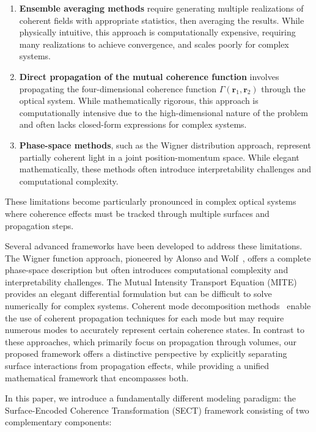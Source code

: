\documentclass[a4paper,12pt]{article}
\begin{document}
\begin{enumerate}
    \item \textbf{Ensemble averaging methods} require generating multiple realizations of coherent fields with appropriate statistics, then averaging the results. While physically intuitive, this approach is computationally expensive, requiring many realizations to achieve convergence, and scales poorly for complex systems.
    
    \item \textbf{Direct propagation of the mutual coherence function} involves propagating the four-dimensional coherence function $\Gamma(\bm{r}_1, \bm{r}_2)$ through the optical system. While mathematically rigorous, this approach is computationally intensive due to the high-dimensional nature of the problem and often lacks closed-form expressions for complex systems.
    
    \item \textbf{Phase-space methods}, such as the Wigner distribution approach, represent partially coherent light in a joint position-momentum space. While elegant mathematically, these methods often introduce interpretability challenges and computational complexity.
\end{enumerate}

These limitations become particularly pronounced in complex optical systems where coherence effects must be tracked through multiple surfaces and propagation steps.

Several advanced frameworks have been developed to address these limitations. The Wigner function approach, pioneered by 
Alonso and Wolf~\cite{Alonso2011}, offers a complete phase-space description but often introduces computational 
complexity and interpretability challenges. The Mutual Intensity Transport Equation (MITE)~\cite{FischerVisser2004} 
provides an elegant differential formulation but can be difficult to solve numerically for complex systems. Coherent mode 
decomposition methods~\cite{Gori2003} enable the use of coherent propagation techniques for each mode but 
may require numerous modes to accurately represent certain coherence states. In contrast to these approaches, which 
primarily focus on propagation through volumes, our proposed framework offers a distinctive perspective by explicitly separating 
surface interactions from propagation effects, while providing a unified mathematical framework that encompasses both.

In this paper, we introduce a fundamentally different modeling paradigm: the Surface-Encoded Coherence Transformation (SECT) 
framework consisting of two complementary components:
\end{document}
